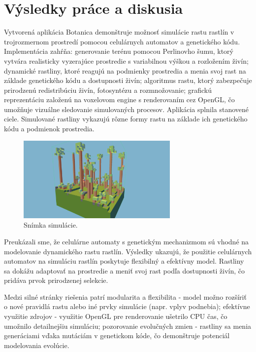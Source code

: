\documentclass[12pt]{article}
\begin{document}
\section{Výsledky práce a diskusia}

Vytvorená aplikácia Botanica demonštruje možnosť simulácie rastu rastlín
v trojrozmernom prostredí pomocou celulárnych automatov a genetického kódu.
Implementácia zahŕňa: generovanie terénu pomocou Perlinovho šumu, ktorý vytvára
realisticky vyzerajúce prostredie s variabilnou výškou a rozložením živín;
dynamické rastliny, ktoré reagujú na podmienky prostredia a menia svoj rast
na základe genetického kódu a dostupnosti živín; algoritmus rastu, ktorý
zabezpečuje prirodzenú redistribúciu živín, fotosyntézu a rozmnožovanie;
grafickú reprezentáciu založenú na voxelovom engine s renderovaním cez OpenGL,
čo umožňuje vizuálne sledovanie simulovaných procesov. Aplikácia splnila
stanovené ciele. Simulované rastliny vykazujú rôzne formy rastu na základe
ich genetického kódu a podmienok prostredia.

\begin{figure}[ht]
	\centering
	\includegraphics[width=0.7\textwidth]{res/screenshot.png}
	\caption{Snímka simulácie.}
\end{figure}

Preukázali sme, že celulárne
automaty s genetickým mechanizmom sú vhodné na modelovanie dynamického rastu
rastlín. Výsledky ukazujú, že použitie celulárnych automatov na simuláciu
rastlín poskytuje flexibilný a efektívny model. Rastliny sa dokážu adaptovať
na prostredie a meniť svoj rast podľa dostupnosti živín, čo pridáva prvok
prirodzenej selekcie.

Medzi silné stránky riešenia patrí modularita a
flexibilita - model možno rozšíriť o nové pravidlá rastu alebo iné prvky
simulácie (napr. vplyv podnebia); efektívne využitie zdrojov - využitie OpenGL
pre renderovanie ušetrilo CPU čas, čo umožnilo detailnejšiu simuláciu;
pozorovanie evolučných zmien - rastliny sa menia generáciami vďaka mutáciám
v genetickom kóde, čo demonštruje potenciál modelovania evolúcie.
\end{document}
